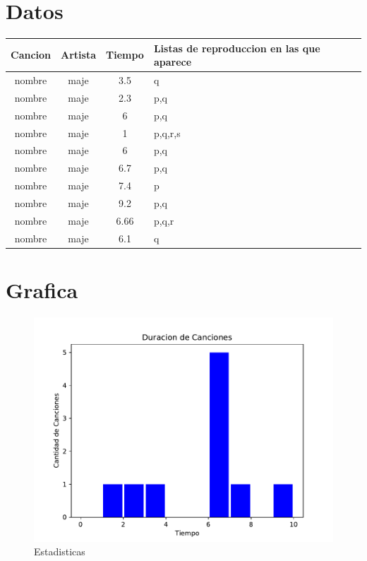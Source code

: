  
 
\begin{titlepage} 

\section*{Datos}
\begin{longtable}{||c|c|c|p{4cm}||}
\hline 
\hline 
Cancion & Artista & Tiempo & Listas de reproduccion en las que aparece \\ 
\hline 
nombre & maje & 3.5 & q \\ 
\hline 
nombre & maje & 2.3 & p,q \\ 
\hline 
nombre & maje & 6 & p,q \\ 
\hline 
nombre & maje & 1 & p,q,r,s \\ 
\hline 
nombre & maje & 6 & p,q \\ 
\hline 
nombre & maje & 6.7 & p,q \\ 
\hline 
nombre & maje & 7.4 & p \\ 
\hline 
nombre & maje & 9.2 & p,q \\ 
\hline 
nombre & maje & 6.66 & p,q,r \\ 
\hline 
nombre & maje & 6.1 & q \\ 
\hline 
\hline 
\hline 
\end{longtable}
\section*{Grafica} 
\begin{figure}[H] 
\centering 
\includegraphics[scale=0.7]{histograma.pdf} 
\caption{Estadisticas} 
\end{figure} 
\end{titlepage}
